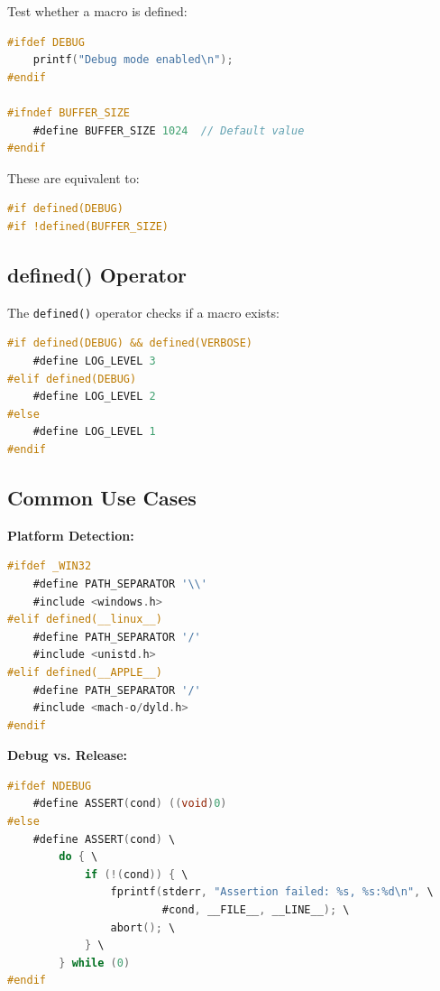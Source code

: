 Test whether a macro is defined:

\begin{lstlisting}[language=C]
#ifdef DEBUG
    printf("Debug mode enabled\n");
#endif

#ifndef BUFFER_SIZE
    #define BUFFER_SIZE 1024  // Default value
#endif
\end{lstlisting}

These are equivalent to:

\begin{lstlisting}[language=C]
#if defined(DEBUG)
#if !defined(BUFFER_SIZE)
\end{lstlisting}

\subsection{defined() Operator}

The \texttt{defined()} operator checks if a macro exists:

\begin{lstlisting}[language=C]
#if defined(DEBUG) && defined(VERBOSE)
    #define LOG_LEVEL 3
#elif defined(DEBUG)
    #define LOG_LEVEL 2
#else
    #define LOG_LEVEL 1
#endif
\end{lstlisting}

\subsection{Common Use Cases}

\textbf{Platform Detection:}

\begin{lstlisting}[language=C]
#ifdef _WIN32
    #define PATH_SEPARATOR '\\'
    #include <windows.h>
#elif defined(__linux__)
    #define PATH_SEPARATOR '/'
    #include <unistd.h>
#elif defined(__APPLE__)
    #define PATH_SEPARATOR '/'
    #include <mach-o/dyld.h>
#endif
\end{lstlisting}

\textbf{Debug vs. Release:}

\begin{lstlisting}[language=C]
#ifdef NDEBUG
    #define ASSERT(cond) ((void)0)
#else
    #define ASSERT(cond) \
        do { \
            if (!(cond)) { \
                fprintf(stderr, "Assertion failed: %s, %s:%d\n", \
                        #cond, __FILE__, __LINE__); \
                abort(); \
            } \
        } while (0)
#endif
\end{lstlisting}


